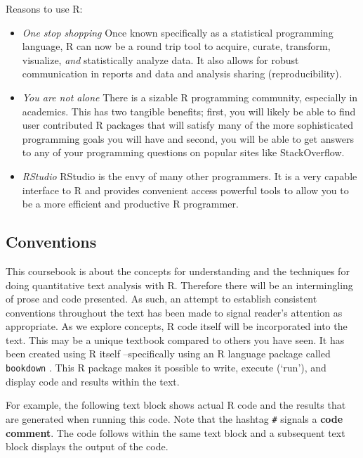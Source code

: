 \documentclass[
]{article}
\providecommand{\tightlist}{%
  \setlength{\itemsep}{0pt}\setlength{\parskip}{0pt}}
\begin{document}
Reasons to use R:

\begin{itemize}
\tightlist
\item
  \emph{One stop shopping} Once known specifically as a statistical programming language, R can now be a round trip tool to acquire, curate, transform, visualize, \emph{and} statistically analyze data. It also allows for robust communication in reports and data and analysis sharing (reproducibility).
\item
  \emph{You are not alone} There is a sizable R programming community, especially in academics. This has two tangible benefits; first, you will likely be able to find user contributed R packages that will satisfy many of the more sophisticated programming goals you will have and second, you will be able to get answers to any of your programming questions on popular sites like StackOverflow.
\item
  \emph{RStudio} RStudio is the envy of many other programmers. It is a very capable interface to R and provides convenient access powerful tools to allow you to be a more efficient and productive R programmer.
\end{itemize}

\hypertarget{conventions}{%
\subsection{Conventions}\label{conventions}}

This coursebook is about the concepts for understanding and the techniques for doing quantitative text analysis with R. Therefore there will be an intermingling of prose and code presented. As such, an attempt to establish consistent conventions throughout the text has been made to signal reader's attention as appropriate. As we explore concepts, R code itself will be incorporated into the text. This may be a unique textbook compared to others you have seen. It has been created using R itself --specifically using an R language package called \texttt{bookdown} \citep{R-bookdown}. This R package makes it possible to write, execute (`run'), and display code and results within the text.

For example, the following text block shows actual R code and the results that are generated when running this code. Note that the hashtag \texttt{\#} signals a \textbf{code comment}. The code follows within the same text block and a subsequent text block displays the output of the code.
\end{document}
